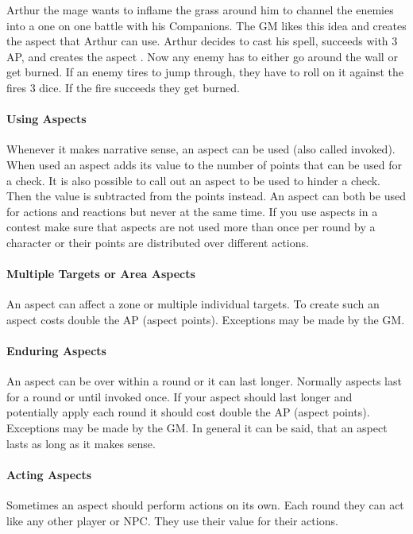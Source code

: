 \documentclass[11pt]{article}
\begin{document}
{\begin{pwexample}
Arthur the mage wants to inflame the grass around him to channel the enemies into a one on one battle with his Companions. The GM likes this idea and creates the aspect  that Arthur can use. Arthur decides to cast his spell, succeeds with 3 AP, and creates the aspect . Now any enemy has to either go around the wall or get burned. If an enemy tires to jump through, they have to roll on it against the fires 3 dice. If the fire succeeds they get burned.
\end{pwexample}
\paragraph*{Using Aspects}
\label{sec:org083914a}

Whenever it makes narrative sense, an aspect can be used (also called invoked). When used an aspect adds its value to the number of points that can be used for a check. It is also possible to call out an aspect to be used to hinder a check. Then the value is subtracted from the points instead. An aspect can both be used for actions and reactions but never at the same time. If you use aspects in a contest make sure that aspects are not used more than once per round by a character or their points are distributed over different actions.
\paragraph*{Multiple Targets or Area Aspects}
\label{sec:orge5e0932}
An aspect can affect a zone or multiple individual targets. To create such an aspect costs double the AP (aspect points). Exceptions may be made by the GM. 
\paragraph*{Enduring Aspects}
\label{sec:orgafbb491}
An aspect can be over within a round or it can last longer. Normally aspects last for a round or until invoked once. If your aspect should last longer and potentially apply each round it should cost double the AP (aspect points). Exceptions may be made by the GM. In general it can be said, that an aspect lasts as long as it makes sense.
\paragraph*{Acting Aspects}
\label{sec:orgaa94ebc}

Sometimes an aspect should perform actions on its own. Each round they can act like any other player or NPC. They use their value for their actions.

}
\end{document}
